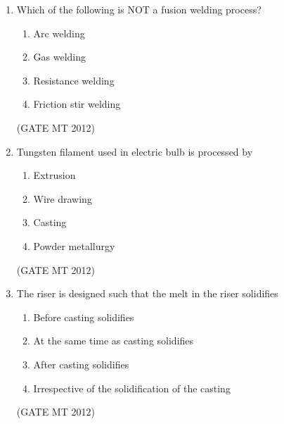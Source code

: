 \documentclass[journal, 11pt, onecolumn]{IEEEtran}
\theoremstyle{remark}
\begin{document}
\begin{enumerate}
\begin{enumerate}
\begin{multicols}{2}
\begin{enumerate}  
\item \( E_c = (1-f)E_m + f E_f \)
\item \( E_c = fE_m + (1-f)E_f \)
\item \( \frac{1}{E_c} = \frac{(1-f)}{E_m} + \frac{f}{E_f} \)
\item \( \frac{1}{E_c} = \frac{f}{E_m} + \frac{(1-f)}{E_f} \)
\end{enumerate}
\end{multicols}
\hfill(GATE MT 2012)

\item Which of the following is NOT a fusion welding process?

\begin{multicols}{2}
\begin{enumerate}  
\item Arc welding
\item Gas welding
\item Resistance welding
\item Friction stir welding
\end{enumerate}
\end{multicols}
\hfill(GATE MT 2012)

\item Tungsten filament used in electric bulb is processed by

\begin{multicols}{2}
\begin{enumerate}  
\item Extrusion
\item Wire drawing
\item Casting
\item Powder metallurgy
\end{enumerate}
\end{multicols}
\hfill(GATE MT 2012)

\item The riser is designed such that the melt in the riser solidifies

\begin{enumerate}  
\item Before casting solidifies
\item At the same time as casting solidifies
\item After casting solidifies
\item Irrespective of the solidification of the casting
\end{enumerate}
\hfill(GATE MT 2012)



\end{enumerate}
\end{enumerate}
\end{document}
